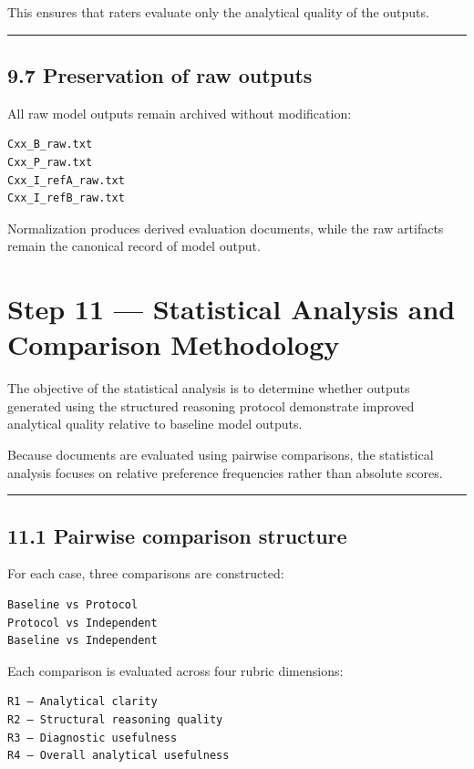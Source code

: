 {This ensures that raters evaluate only the analytical quality of the outputs.

\noindent\rule{\textwidth}{0.4pt}

\subsection*{9.7 Preservation of raw outputs}

All raw model outputs remain archived without modification:

\begin{verbatim}
Cxx_B_raw.txt
Cxx_P_raw.txt
Cxx_I_refA_raw.txt
Cxx_I_refB_raw.txt
\end{verbatim}

Normalization produces derived evaluation documents, while the raw artifacts remain the canonical record of model output.

\section*{Step 11 — Statistical Analysis and Comparison Methodology}

The objective of the statistical analysis is to determine whether outputs generated using the structured reasoning protocol demonstrate improved analytical quality relative to baseline model outputs.

Because documents are evaluated using pairwise comparisons, the statistical analysis focuses on relative preference frequencies rather than absolute scores.

\noindent\rule{\textwidth}{0.4pt}

\subsection*{11.1 Pairwise comparison structure}

For each case, three comparisons are constructed:

\begin{verbatim}
Baseline vs Protocol
Protocol vs Independent
Baseline vs Independent
\end{verbatim}

Each comparison is evaluated across four rubric dimensions:

\begin{verbatim}
R1 — Analytical clarity
R2 — Structural reasoning quality
R3 — Diagnostic usefulness
R4 — Overall analytical usefulness
\end{verbatim}

}
